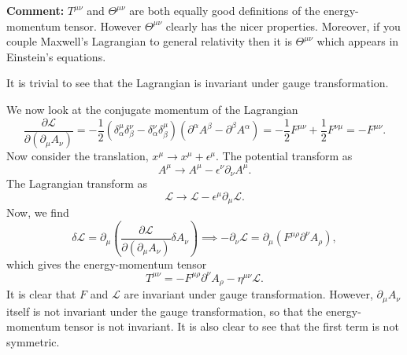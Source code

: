 \textbf{Comment:} $T^{\mu\nu}$ and $\Theta^{\mu\nu}$ are both equally good definitions of the energy-momentum tensor. However $\Theta^{\mu\nu}$ clearly has the nicer properties. Moreover, if you couple Maxwell's Lagrangian to general relativity then it is $\Theta^{\mu\nu}$ which appears in Einstein's equations.\

\begin{solution}
    It is trivial to see that the Lagrangian is invariant under gauge transformation. 

    We now look at the conjugate momentum of the Lagrangian
    \begin{equation}
        \frac{\partial\mathcal{L}}{\partial(\partial_\mu A_\nu)}=-\frac{1}{2}(\delta_\alpha^\mu\delta_\beta^\nu - \delta_\alpha^\nu\delta_\beta^\mu)(\partial^\alpha A^\beta - \partial^\beta A^\alpha) = -\frac{1}{2}F^{\mu\nu} + \frac{1}{2}F^{\nu\mu} = - F^{\mu\nu}.
        \label{eq:conjugateA}
    \end{equation}
    Now consider the translation, $x^\mu \to x^\mu + \epsilon^\mu$. The potential transform as
    \begin{equation}
        A^\mu \to A^\mu - \epsilon^\nu \partial_\nu A^\mu.
    \end{equation}
    The Lagrangian transform as
    \begin{equation}
        \mathcal{L} \to \mathcal{L} - \epsilon^\mu \partial_\mu \mathcal{L}.
    \end{equation}
    Now, we find
    \begin{equation}
        \delta\mathcal{L} =  \partial_\mu \left(\frac{\partial\mathcal{L}}{\partial(\partial_\mu A_\nu)}\delta A_\nu\right) \implies -\partial_\nu \mathcal{L} = \partial_\mu(F^{\mu\rho}\partial^\nu A_\rho),
    \end{equation}
    which gives the energy-momentum tensor
    \begin{equation}
        T^{\mu\nu} = -F^{\mu\rho}\partial^\nu A_\rho  -\eta^{\mu\nu}\mathcal{L}.
    \end{equation}
    It is clear that $F$ and $\mathcal{L}$ are invariant under gauge transformation. However, $\partial_\mu A_\nu$ itself is not invariant under the gauge transformation, so that the energy-momentum tensor is not invariant. It is also clear to see that the first term is not symmetric.


\end{solution}
